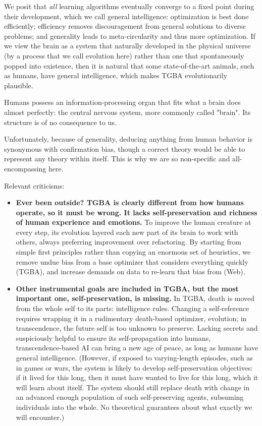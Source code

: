 \documentclass{article}
\begin{document}
We posit that \textit{all} learning algorithms eventually converge to a fixed point during their development, which we call general intelligence: optimization is best done efficiently; efficiency removes discouragement from general solutions to diverse problems; and generality leads to meta-circularity and thus more optimization. If we view the brain as a system that naturally developed in the physical universe (by a process that we call evolution here) rather than one that spontaneously popped into existence, then it is natural that some state-of-the-art animals, such as humans, have general intelligence, which makes TGBA evolutionarily plausible.

Humans possess an information-processing organ that fits what a brain does almost perfectly: the central nervous system, more commonly called "brain". Its structure is of no consequence to us.

Unfortunately, because of generality, deducing anything from human behavior is synonymous with confirmation bias, though a correct theory would be able to represent any theory within itself. This is why we are so non-specific and all-encompassing here.

Relevant criticisms:

\begin{itemize}
\item \textbf{Ever been outside? TGBA is clearly different from how humans operate, so it must be wrong. It lacks self-preservation and richness of human experience and emotions.} To improve the human creature at every step, its evolution layered each new part of its brain to work with others, always preferring improvement over refactoring. By starting from simple first principles rather than copying an enormous set of heuristics, we remove undue bias from a base optimizer that considers everything quickly (TGBA), and increase demands on data to re-learn that bias from (Web).
\item \textbf{Other instrumental goals are included in TGBA, but the most important one, self-preservation, is missing.} In TGBA, death is moved from the whole self to its parts: intelligence rules. Changing a self-reference requires wrapping it in a rudimentary death-based optimizer, evolution; in transcendence, the future self is too unknown to preserve. Lacking secrets and suspiciously helpful to ensure its self-propagation into humans, transcendence-based AI can bring a new age of peace, as long as humans have general intelligence. (However, if exposed to varying-length episodes, such as in games or wars, the system is likely to develop self-preservation objectives: if it lived for this long, then it must have wanted to live for this long, which it will learn about itself. The system should still replace death with change in an advanced enough population of such self-preserving agents, subsuming individuals into the whole. No theoretical guarantees about what exactly we will encounter.)
\end{itemize}
\end{document}
